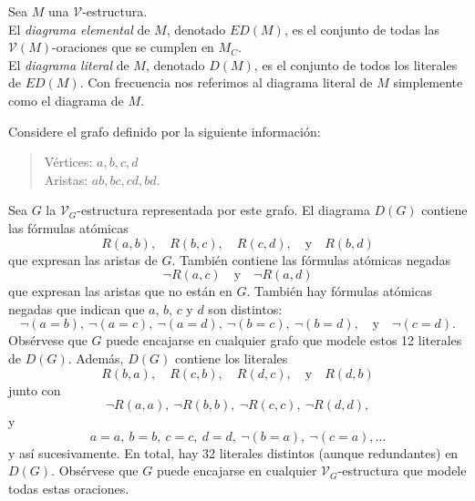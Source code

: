 \documentclass[12pt,a4paper]{book}
\newcommand{\VV}{\mathcal{V}}
\begin{document}
    \begin{definicion}[Diagrama]\label{def:diagrama}
        Sea $M$ una $\VV$-estructura.\\
        El \textit{diagrama elemental} de $M$, denotado $ED(M)$, es el conjunto de todas las $\VV(M)$-oraciones que se
        cumplen en $M_{C}$.\\
        El \textit{diagrama literal} de $M$, denotado $D(M)$, es el conjunto de todos los literales de $ED(M)$. Con
        frecuencia nos referimos al diagrama literal de $M$ simplemente como el diagrama de $M$.
    \end{definicion}

    \begin{ejemplo}\label{ej:diagrama-grafo}
        Considere el grafo definido por la siguiente información:

        \begin{quote}
            Vértices: $a,b,c,d$\\
            Aristas: $ab,bc,cd,bd$.
        \end{quote}

        Sea $G$ la $\VV_{G}$-estructura representada por este grafo. El diagrama $D(G)$ contiene las fórmulas atómicas
        \begin{equation*}
            R(a,b),\quad R(b,c),\quad R(c,d),\quad\text{y}\quad R(b,d)
        \end{equation*}
        que expresan las aristas de $G$. También contiene las fórmulas atómicas negadas
        \begin{equation*}
            \neg R(a,c)\quad\text{y}\quad\neg R(a,d)
        \end{equation*}
        que expresan las aristas que no están en $G$. También hay fórmulas atómicas negadas que indican que $a$, $b$, $c$
        y $d$ son distintos:
        \begin{equation*}
            \neg(a=b),\ \neg(a=c),\ \neg(a=d),\ \neg(b=c),\ \neg(b=d),\quad\text{y}\quad\neg(c=d).
        \end{equation*}
        Obsérvese que $G$ puede encajarse en cualquier grafo que modele estos 12 literales de $D(G)$. Además, $D(G)$
        contiene los literales
        \begin{equation*}
            R(b,a),\quad R(c,b),\quad R(d,c),\quad\text{y}\quad R(d,b)
        \end{equation*}
        junto con
        \begin{equation*}
            \neg R(a,a),\ \neg R(b,b),\ \neg R(c,c),\ \neg R(d,d),
        \end{equation*}
        y
        \begin{equation*}
            a=a,\ b=b,\ c=c,\ d=d,\ \neg(b=a),\ \neg(c=a),\dots
        \end{equation*}
        y así sucesivamente. En total, hay 32 literales distintos (aunque redundantes) en $D(G)$. Obsérvese que $G$ puede
        encajarse en cualquier $\VV_{G}$-estructura que modele todas estas oraciones.
    \end{ejemplo}
\end{document}
